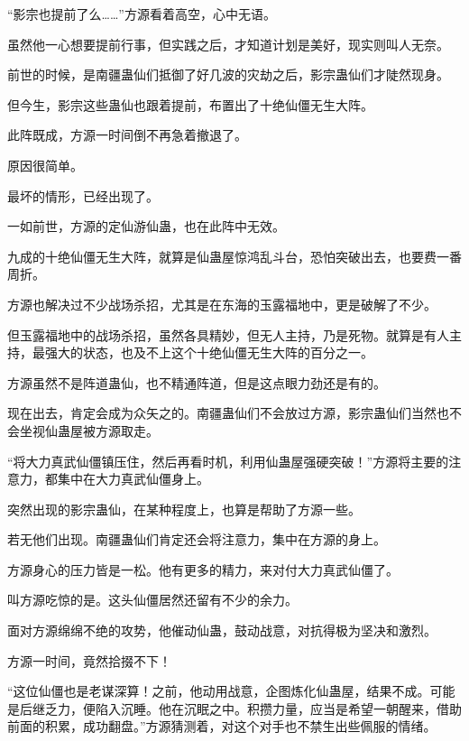 
\begin{this_body}



“影宗也提前了么……”方源看着高空，心中无语。

虽然他一心想要提前行事，但实践之后，才知道计划是美好，现实则叫人无奈。

前世的时候，是南疆蛊仙们抵御了好几波的灾劫之后，影宗蛊仙们才陡然现身。

但今生，影宗这些蛊仙也跟着提前，布置出了十绝仙僵无生大阵。

此阵既成，方源一时间倒不再急着撤退了。

原因很简单。

最坏的情形，已经出现了。

一如前世，方源的定仙游仙蛊，也在此阵中无效。

九成的十绝仙僵无生大阵，就算是仙蛊屋惊鸿乱斗台，恐怕突破出去，也要费一番周折。

方源也解决过不少战场杀招，尤其是在东海的玉露福地中，更是破解了不少。

但玉露福地中的战场杀招，虽然各具精妙，但无人主持，乃是死物。就算是有人主持，最强大的状态，也及不上这个十绝仙僵无生大阵的百分之一。

方源虽然不是阵道蛊仙，也不精通阵道，但是这点眼力劲还是有的。

现在出去，肯定会成为众矢之的。南疆蛊仙们不会放过方源，影宗蛊仙们当然也不会坐视仙蛊屋被方源取走。

“将大力真武仙僵镇压住，然后再看时机，利用仙蛊屋强硬突破！”方源将主要的注意力，都集中在大力真武仙僵身上。

突然出现的影宗蛊仙，在某种程度上，也算是帮助了方源一些。

若无他们出现。南疆蛊仙们肯定还会将注意力，集中在方源的身上。

方源身心的压力皆是一松。他有更多的精力，来对付大力真武仙僵了。

叫方源吃惊的是。这头仙僵居然还留有不少的余力。

面对方源绵绵不绝的攻势，他催动仙蛊，鼓动战意，对抗得极为坚决和激烈。

方源一时间，竟然拾掇不下！

“这位仙僵也是老谋深算！之前，他动用战意，企图炼化仙蛊屋，结果不成。可能是后继乏力，便陷入沉睡。他在沉眠之中。积攒力量，应当是希望一朝醒来，借助前面的积累，成功翻盘。”方源猜测着，对这个对手也不禁生出些佩服的情绪。


\end{this_body}
